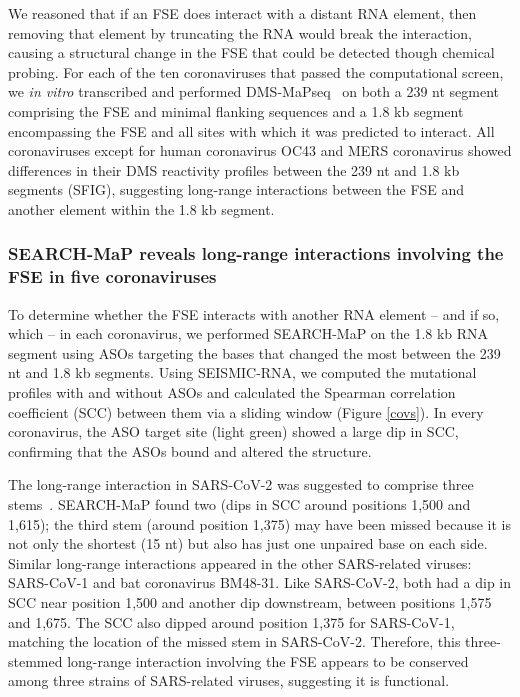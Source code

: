 \documentclass[main.tex]{subfiles}
\begin{document}
We reasoned that if an FSE does interact with a distant RNA element, then removing that element by truncating the RNA would break the interaction, causing a structural change in the FSE that could be detected though chemical probing.
For each of the ten coronaviruses that passed the computational screen, we \textit{in vitro} transcribed and performed DMS-MaPseq~\cite{Zubradt2016} on both a 239 nt segment comprising the FSE and minimal flanking sequences and a 1.8 kb segment encompassing the FSE and all sites with which it was predicted to interact.
All coronaviruses except for human coronavirus OC43 and MERS coronavirus showed differences in their DMS reactivity profiles between the 239 nt and 1.8 kb segments (SFIG), suggesting long-range interactions between the FSE and another element within the 1.8 kb segment.


\subsubsection{SEARCH-MaP reveals long-range interactions involving the FSE in five coronaviruses}

To determine whether the FSE interacts with another RNA element -- and if so, which -- in each coronavirus, we performed SEARCH-MaP on the 1.8 kb RNA segment using ASOs targeting the bases that changed the most between the 239 nt and 1.8 kb segments.
Using SEISMIC-RNA, we computed the mutational profiles with and without ASOs and calculated the Spearman correlation coefficient (SCC) between them via a sliding window (Figure \ref{covs}).
In every coronavirus, the ASO target site (light green) showed a large dip in SCC, confirming that the ASOs bound and altered the structure.

The long-range interaction in SARS-CoV-2 was suggested to comprise three stems~\cite{Ziv2020}.
SEARCH-MaP found two (dips in SCC around positions 1,500 and 1,615); the third stem (around position 1,375) may have been missed because it is not only the shortest (15 nt) but also has just one unpaired base on each side.
Similar long-range interactions appeared in the other SARS-related viruses: SARS-CoV-1 and bat coronavirus BM48-31.
Like SARS-CoV-2, both had a dip in SCC near position 1,500 and another dip downstream, between positions 1,575 and 1,675. 
The SCC also dipped around position 1,375 for SARS-CoV-1, matching the location of the missed stem in SARS-CoV-2.
Therefore, this three-stemmed long-range interaction involving the FSE appears to be conserved among three strains of SARS-related viruses, suggesting it is functional.
\end{document}
